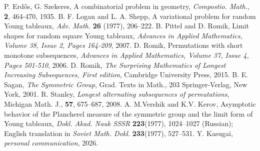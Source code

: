 \documentclass[11pt, a4paper]{article}
\theoremstyle{compact}
\begin{document}
    \begin{thebibliography}{}
        P. Erd\H{o}s, G. Szekeres, A combinatorial problem in geometry, \emph{Compostio. Math.}, {\bf 2}, 464-470, 1935.
        B. F. Logan and L. A. Shepp, A variational problem for random Young tableaux, \emph{Adv. Math.} \textbf{26} (1977), 206–222.
        B. Pittel and D. Romik, Limit shapes for random square Young tableaux, \emph{Advances in Applied Mathematics, Volume 38, Issue 2, Pages 164-209}, 2007.
        D. Romik, Permutations with short monotone subsequences, \emph{Advances in Applied Mathematics, Volume 37, Issue 4, Pages 501-510}, 2006.
        D. Romik, \emph{The Surprising Mathematics of Longest Increasing Subsequences, First edition}, Cambridge University Press, 2015.
        B. E. Sagan, \emph{The Symmetric Group}, Grad. Texts in Math., 203
Springer-Verlag, New York, 2001.
        R. Stanley, \emph{Longest alternating subsequences of permutations}, Michigan Math. J., \textbf{57}, 675–687, 2008.
        A. M.Vershik and K.V. Kerov, Asymptotic behavior of the Plancherel measure of the symmetric group and the limit form of Young tableaux, \emph{Dokl. Akad. Nauk SSSR} \textbf{223}(1977), 1024–1027 (Russian); English translation in \emph{Soviet Math. Dokl.} \textbf{233}(1977), 527–531.
        Y. Kasugai, {\it personal communication}, 2026.
     \end{thebibliography}
\end{document}
